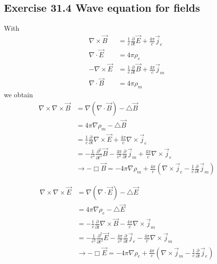\documentclass[../main.tex]{subfiles}
\begin{document}
\subsection{Exercise 31.4 Wave equation for fields}
With
\begin{align}
\nabla\times\vec{B}&=\frac{1}{c}\frac{\partial}{\partial t}\vec{E}+\frac{4\pi}{c}\vec{j}_e\\
\nabla\cdot\vec{E}&=4\pi\rho_e\\
-\nabla\times\vec{E}&=\frac{1}{c}\frac{\partial}{\partial t}\vec{B}+\frac{4\pi}{c}\vec{j}_m\\
\nabla\cdot\vec{B}&=4\pi\rho_m
\end{align}
we obtain
\begin{align}
\nabla\times\nabla\times\vec{B}
&=\nabla(\nabla\cdot\vec{B})-\triangle\vec{B}\\
&=4\pi\nabla\rho_m-\triangle\vec{B}\\
&=\frac{1}{c}\frac{\partial}{\partial t}\nabla\times\vec{E}+\frac{4\pi}{c}\nabla\times\vec{j}_e\\
&=-\frac{1}{c^2}\frac{\partial^2}{\partial t^2}\vec{B}-\frac{4\pi}{c^2}\frac{\partial}{\partial t}\vec{j}_m+\frac{4\pi}{c}\nabla\times\vec{j}_e\\
&\rightarrow-\Box\vec{B}=-4\pi\nabla\rho_m+\frac{4\pi}{c}(\nabla\times\vec{j}_e-\frac{1}{c}\frac{\partial}{\partial t}\vec{j}_m)
\end{align}

\begin{align}
\nabla\times\nabla\times\vec{E}
&=\nabla(\nabla\cdot\vec{E})-\triangle\vec{E}\\
&=4\pi\nabla\rho_e-\triangle\vec{E}\\
&=-\frac{1}{c}\frac{\partial}{\partial t}\nabla\times\vec{B}-\frac{4\pi}{c}\nabla\times\vec{j}_m\\
&=-\frac{1}{c^2}\frac{\partial^2}{\partial t^2}\vec{E}-\frac{4\pi}{c^2}\frac{\partial}{\partial t}\vec{j}_e-\frac{4\pi}{c}\nabla\times\vec{j}_m\\
&\rightarrow-\Box\vec{E}=-4\pi\nabla\rho_e+\frac{4\pi}{c}(\nabla\times\vec{j}_m-\frac{1}{c}\frac{\partial}{\partial t}\vec{j}_e)
\end{align}
\end{document}
